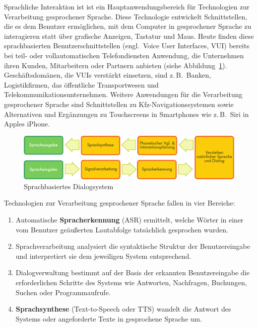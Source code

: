 \begin{multicols}{2}
Sprachliche Interaktion ist 
ist ein Hauptanwendungsbereich für Technologien zur Verarbeitung gesprochener Sprache. 
Diese Technologie entwickelt Schnittstellen, die es dem Benutzer ermöglichen, mit dem Computer in gesprochener Sprache zu interagieren statt über grafische Anzeigen, Tastatur und Maus.
Heute finden diese sprachbasierten Benutzerschnittstellen (engl.~Voice User Interfaces, VUI) bereits bei teil- oder vollautomatischen Telefondiensten Anwendung, die Unternehmen ihren Kunden, Mitarbeitern oder Partnern anbieten (siehe Abbildung~\ref{fig:dialoguearch_de}). Geschäftsdomänen, die VUIs verstärkt einsetzen, sind z.\,B.~Banken, Logistikfirmen, das öffentliche Transportwesen und Telekommunikationsunternehmen. Weitere Anwendungen für die Verarbeitung gesprochener Sprache sind Schnittstellen zu Kfz-Navigationssystemen 
sowie Alternativen und Ergänzungen zu Touchscreens in Smartphones
wie z.\,B.~Siri in Apples iPhone.


\begin{figure}[htb]
  \center  \includegraphics[width=\textwidth]{../_media/german/simple_speech-based_dialogue_architecture}
  \center
  \caption{Sprachbasiertes Dialogsystem}
  \label{fig:dialoguearch_de}
\end{figure}

Technologien zur Verarbeitung gesprochener Sprache fallen in vier Bereiche:

\begin{enumerate}
\item Automatische \textbf{Spracherkennung} (ASR) ermittelt, welche Wörter in einer vom Benutzer geäußerten Lautabfolge tatsächlich gesprochen wurden.
\item Sprachverarbeitung analysiert die syntaktische Struktur der Benutzereingabe und interpretiert sie dem jeweiligen System entsprechend.
\item Dialogverwaltung 
bestimmt auf der Basis der erkannten Benutzereingabe die erforderlichen Schritte des Systems wie Antworten, Nachfragen, Buchungen, Suchen oder Programmaufrufe.
\item \textbf{Sprachsynthese} (Text-to-Speech oder TTS) wandelt die Antwort des Systems oder angeforderte Texte in gesprochene Sprache um.
\end{enumerate}


\end{multicols}
